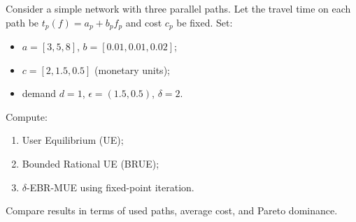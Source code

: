 \documentclass[11pt]{article}
\begin{document}
Consider a simple network with three parallel paths. Let the travel time on each path be $t_p(f) = a_p + b_p f_p$ and cost $c_p$ be fixed. Set:
\begin{itemize}
    \item $a = [3, 5, 8]$, $b = [0.01, 0.01, 0.02]$;
    \item $c = [2, 1.5, 0.5]$ (monetary units);
    \item demand $d = 1$, $\epsilon = (1.5, 0.5)$, $\delta = 2$.
\end{itemize}

Compute:
\begin{enumerate}
    \item User Equilibrium (UE);
    \item Bounded Rational UE (BRUE);
    \item $\delta$-EBR-MUE using fixed-point iteration.
\end{enumerate}

Compare results in terms of used paths, average cost, and Pareto dominance.
\end{document}

